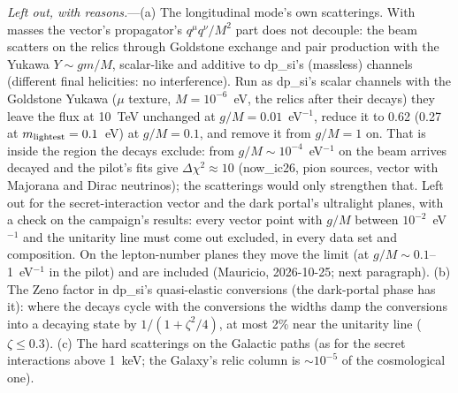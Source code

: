 \documentclass[11pt,a4paper]{article}
\begin{document}
\textit{Left out, with reasons.}---(a) The longitudinal mode's own scatterings. With masses the vector's propagator's
$q^\mu q^\nu/M^2$ part does not decouple: the beam scatters on the relics through Goldstone exchange and pair production
with the Yukawa $Y\sim gm/M$, scalar-like and additive to dp\_si's (massless) channels (different final helicities: no
interference). Run as dp\_si's scalar channels with the Goldstone Yukawa ($\mu$ texture, $M = 10^{-6}$~eV, the
relics after their decays) they leave the flux at 10~TeV unchanged at $g/M = 0.01$~eV$^{-1}$, reduce it to 0.62 (0.27
at $m_{\rm lightest} = 0.1$~eV) at $g/M = 0.1$, and remove it from $g/M = 1$ on. That is inside the region the decays
exclude: from $g/M \sim 10^{-4}$~eV$^{-1}$ on the beam arrives decayed and the pilot's fits give $\Delta\chi^2 \approx 10$
(now\_ic26, pion sources, vector with Majorana and Dirac neutrinos); the scatterings would only strengthen that. Left
out for the secret-interaction vector and the dark portal's ultralight planes, with a check on the campaign's results:
every vector point with $g/M$ between $10^{-2}$~eV$^{-1}$ and the unitarity line must come out excluded, in every data
set and composition. On the lepton-number planes they move the limit (at $g/M\sim0.1$--1~eV$^{-1}$ in the pilot) and are
included (Mauricio, 2026-10-25; next paragraph). (b) The
Zeno factor in dp\_si's quasi-elastic conversions (the dark-portal phase has it): where the decays cycle with the
conversions the widths damp the conversions into a decaying state by $1/(1 + \zeta^2/4)$, at most 2\% near the unitarity
line ($\zeta \le 0.3$). (c) The hard scatterings on the Galactic paths (as for the secret interactions above 1~keV; the
Galaxy's relic column is $\sim10^{-5}$ of the cosmological one).
\end{document}

